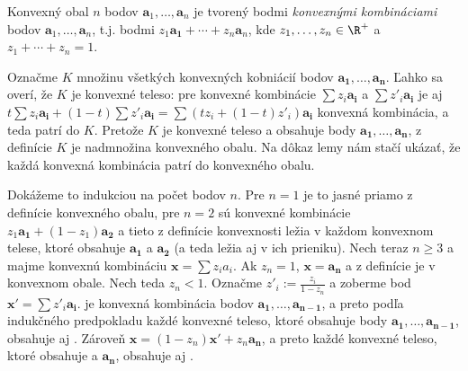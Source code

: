 \begin{shaded}
\begin{lema}
  \label{lm:KO:1}
Konvexný obal $n$ bodov $\bm{a}_1,\ldots,\bm{a}_n$ je 
tvorený bodmi {\em konvexnými kombináciami} bodov  $\bm{a}_1,\ldots,\bm{a}_n$, t.j.
bodmi $z_1\bm{a_1}+\cdots+z_n\bm{a}_n$,
 kde \hbox{$z_1,\ldots,z_n\in\R^+$} a $z_1+\cdots+z_n=1$.  
\end{lema}


\begin{dokaz}
  Označme $K$ množinu všetkých   konvexných kobniácií bodov $\bm{a_1},\ldots,\bm{a_n}$.
  Ľahko sa overí, že $K$
  je konvexné teleso: pre konvexné kombinácie  $\sum z_i\bm{a_i}$ a $\sum z'_i\bm{a_i}$ je
  aj $t\sum z_i\bm{a_i} + (1-t)\sum z'_i\bm{a_i} = \sum (tz_i+(1-t)z'_i)\bm{a_i}$ konvexná kombinácia,
  a teda patrí do $K$. Pretože $K$ je konvexné teleso a obsahuje body $\bm{a_1},\ldots,\bm{a_n}$,
  z definície $K$ je nadmnožina konvexného obalu. Na dôkaz lemy nám stačí ukázať,
  že každá konvexná kombinácia patrí do konvexného obalu.

  
  \noindent
  Dokážeme to indukciou na počet bodov $n$. Pre $n=1$ je to jasné priamo z definície konvexného obalu,
  pre $n=2$ sú konvexné kombinácie $z_1\bm{a_1}+(1-z_1)\bm{a_2}$ a tieto z definície
  konvexnosti ležia v každom konvexnom telese, ktoré obsahuje $\bm{a_1}$ a $\bm{a_2}$ (a teda
  ležia aj v ich prieniku).
  Nech teraz $n\ge 3$ a majme konvexnú kombináciu $\bm{x}=\sum z_ia_i$. Ak $z_n=1$, $\bm{x}=\bm{a_n}$
  a z definície  je v konvexnom obale. Nech teda $z_n<1$. Označme $z'_i:=\frac{z_i}{1-z_n}$
  a zoberme bod $\bm{x'}=\sum z'_i\bm{a_i}$.  je konvexná kombinácia bodov $\bm{a_1},\ldots,\bm{a_{n-1}}$,
  a preto podľa indukčného predpokladu každé konvexné teleso, ktoré obsahuje body $\bm{a_1},\ldots,\bm{a_{n-1}}$,
  obsahuje aj . Zároveň $\bm{x}=(1-z_n)\bm{x'}+z_n\bm{a_n}$, a preto každé konvexné teleso,
  ktoré obsahuje  a $\bm{a_n}$, obsahuje aj .
\end{dokaz}

\noindent
\begin{minipage}[t]{6cm}
  \vspace{0pt}
\begin{center}
\end{center}
\end{minipage}
\end{shaded}
